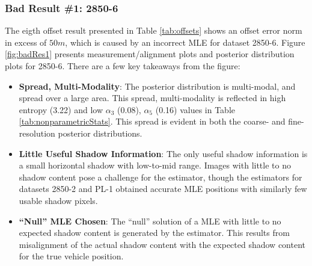 \subsubsection{Bad Result \#1: 2850-6}
\label{rov.Truth.Bad1}

The eigth offset result presented in Table \ref{tab:offsets} shows an offset error norm in excess of $50m$, which is caused by an incorrect MLE for dataset 2850-6.
Figure \ref{fig:badRes1} presents measurement/alignment plots and posterior distribution plots for 2850-6.
There are a few key takeaways from the figure:

\begin{itemize}
\item \textbf{Spread, Multi-Modality}: The posterior distribution is multi-modal, and spread over a large area. This spread, multi-modality is reflected in high entropy (3.22) and low $\alpha_3$ (0.08), $\alpha_5$ (0.16) values in Table \ref{tab:nonparametricStats}.  This spread is evident in both the coarse- and fine-resolution posterior distributions.
\item \textbf{Little Useful Shadow Information}: The only useful shadow information is a small horizontal shadow with low-to-mid range. Images with little to no shadow content pose a challenge for the estimator, though the estimators for datasets 2850-2 and PL-1 obtained accurate MLE positions with similarly few usable shadow pixels.
\item \textbf{``Null'' MLE Chosen}: The ``null'' solution of a MLE with little to no expected shadow content is generated by the estimator. This results from misalignment of the actual shadow content with the expected shadow content for the true vehicle position.
\end{itemize}

